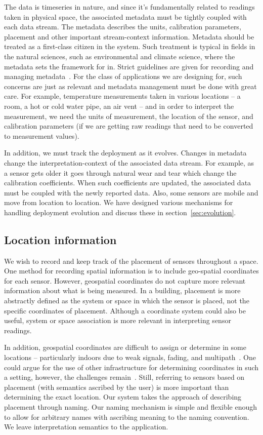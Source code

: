 The data is timeseries in nature, and since it's fundamentally related to readings taken in physical space, 
the associated metadata must be tightly coupled with each data stream.  The metadata
describes the units, calibration parameters, placement and other important stream-context information.  
Metadata should be treated as a first-class citizen in the system.  Such treatment
is typical in fields in the natural sciences, such as environmental and climate science, where the metadata sets the framework
for in.  Strict guidelines are given for recording and managing metadata~\cite{meta_climate}.  For the class
of applications we are designing for, such concerns are just as relevant and metadata management must be done with
great care.  For example, temperature measurements taken in various locations -- a room, a hot or cold water pipe, an air vent -- 
and in order to interpret the measurement, we need the units of measurement, the location of the sensor, and calibration parameters
(if we are getting raw readings that need to be converted to measurement values).

In addition, we must track the deployment as it evolves.  Changes in metadata change the interpretation-context of the associated data stream.  
For example, as a sensor gets older it goes through natural wear and tear which change the calibration coefficients.  When such 
coefficients are updated, the associated data must be coupled with the newly reported data.   Also, some sensors are mobile and move from location 
to location.  We have designed various mechanisms for handling deployment evolution and discuss these in section~\ref{sec:evolution}.

\subsection{Location information}
We wish to record and keep track of the placement of sensors throughout a space.  One method for recording spatial information
is to include geo-spatial coordinates for each sensor.  However, geospatial coordinates do not capture more relevant information
about what is being measured.  In a building, placement is more abstractly defined as the system or space in which the sensor
is placed, not the specific coordinates of placement.  Although a coordinate system could also be useful, system or space association
is more relevant in interpreting sensor readings.

In addition, geospatial coordinates are difficult to assign or determine in some locations -- particularly indoors due
to weak signals, fading, and multipath~\cite{indoorGPS}.  One could argue for the use of other infrastructure for determining coordinates
in such a setting, however, the challenges remain~\cite{multipath, cricket, wifiindoors}.  Still, referring to sensors based on placement
(with semantics ascribed by the user) is more important than determining the exact location.  Our system takes the approach of
describing placement through naming.  Our naming mechanism is simple and flexible enough to allow for arbitrary names
with ascribing meaning to the naming convention.  We leave interpretation semantics to the application.

